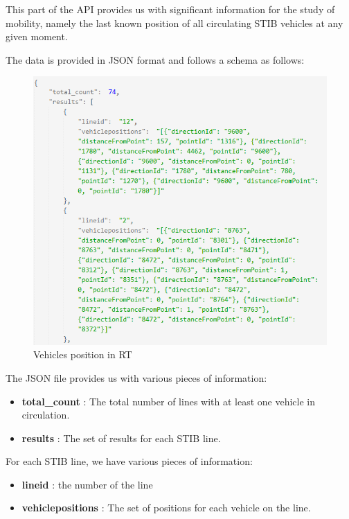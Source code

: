 \documentclass[12pt]{report}
\begin{document}
	This part of the API provides us with significant information for the study of mobility, namely the last known position of all circulating STIB vehicles at any given moment. 
	
	The data is provided in JSON format and follows a schema as follows:
	
	\begin{figure}
		\centering
		\includegraphics[width=\textwidth]{images/RTResponseJson}
		\caption{Vehicles position in RT}
		\label{RT_Position_content}
	\end{figure}
	
	
	The JSON file provides us with various pieces of information:
	
	\begin{center}
		\begin{itemize}[noitemsep]
			\item \textbf{total\_count} : The total number of lines with at least one vehicle in circulation.
			\item \textbf{results} : The set of results for each STIB line.
		\end{itemize}
	\end{center}
	
	
	For each STIB line, we have various pieces of information:
	 
	\begin{center}
		\begin{itemize}[noitemsep]
			\item \textbf{lineid} : the number of the line
			\item \textbf{vehiclepositions} : The set of positions for each vehicle on the line.
		\end{itemize}
	\end{center}
	
\end{document}
